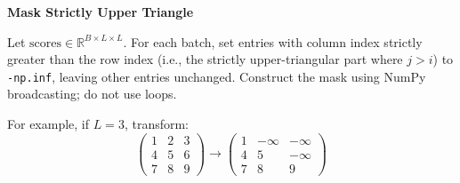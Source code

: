 \item {} \textbf{Mask Strictly Upper Triangle}

Let $\text{scores} \in \mathbb{R}^{B\times L\times L}$. For each batch, set entries with column index strictly greater than the row index (i.e., the strictly upper-triangular part where $j>i$) to \texttt{-np.inf}, leaving other entries unchanged. Construct the mask using NumPy broadcasting; do not use loops.

For example, if $L=3$, transform:
$$\begin{pmatrix} 1 & 2 & 3 \\ 4 & 5 & 6 \\ 7 & 8 & 9 \end{pmatrix} \rightarrow \begin{pmatrix} 1 & -\infty & -\infty \\ 4 & 5 & -\infty \\ 7 & 8 & 9 \end{pmatrix}$$

